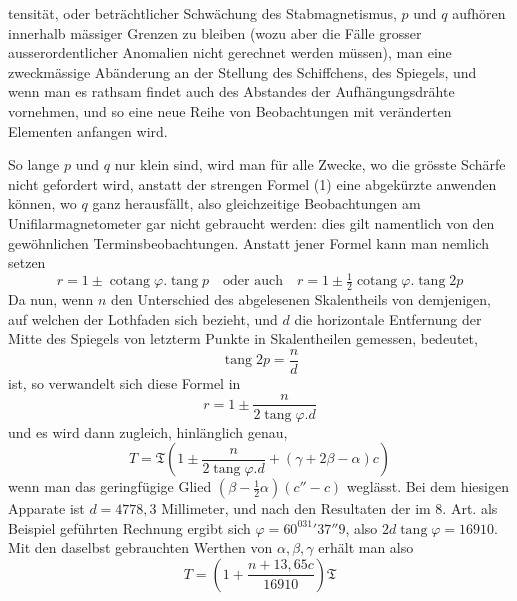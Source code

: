 tensität, oder beträchtlicher Schwächung des Stabmagnetismus, $p$ und $q$ aufhören innerhalb mässiger Grenzen zu bleiben (wozu aber die Fälle grosser ausserordentlicher Anomalien nicht gerechnet werden müssen), man eine zweckmässige Abänderung an der Stellung des Schiffchens, des Spiegels, und wenn man es rathsam findet auch des Abstandes der Aufhängungsdrähte vornehmen, und so eine neue Reihe von Beobachtungen mit veränderten Elementen anfangen wird.

So lange $p$ und $q$ nur klein sind, wird man für alle Zwecke, wo die grösste Schärfe nicht gefordert wird, anstatt der strengen Formel (1) eine abgekürzte anwenden können, wo $q$ ganz herausfällt, also gleichzeitige Beobachtungen am Unifilarmagnetometer gar nicht gebraucht werden: dies gilt namentlich von den gewöhnlichen Terminsbeobachtungen. Anstatt jener Formel kann man nemlich setzen
\[
r=1\pm\operatorname{cotang}\varphi.\operatorname{tang}p\quad\text{oder auch}\quad r=1\pm\tfrac12\operatorname{cotang}\varphi.\operatorname{tang}2p
\]
Da nun, wenn $n$ den Unterschied des abgelesenen Skalentheils von demjenigen, auf welchen der Lothfaden sich bezieht, und $d$ die horizontale Entfernung der Mitte des Spiegels von letzterm Punkte in Skalentheilen gemessen, bedeutet,
\[
\operatorname{tang}2p=\frac{n}{d}
\]
ist, so verwandelt sich diese Formel in
\[
r=1\pm\frac{n}{2\operatorname{tang}\varphi.d}
\]
und es wird dann zugleich, hinlänglich genau,
\[
T=\mathfrak{T}(1\pm\frac{n}{2\operatorname{tang}\varphi.d}+(\gamma+2\beta-\alpha)c)
\]
wenn man das geringfügige Glied $(\beta-\tfrac12\alpha)(c''-c)$ weglässt. Bei dem hiesigen Apparate ist $d=4778{,}3$ Millimeter, und nach den Resultaten der im 8. Art. als Beispiel geführten Rechnung ergibt sich $\varphi=60^031'37''9$, also $2d\operatorname{tang}\varphi=16910$. Mit den daselbst gebrauchten Werthen von $\alpha,\beta,\gamma$ erhält man also
\[
T=(1+\frac{n+13{,}65c}{16910})\mathfrak{T}
\]
